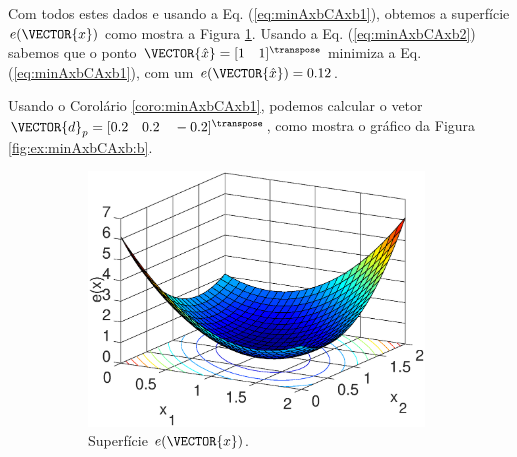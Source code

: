 \begin{SolutionT}
\label{ex:minAxbCAxb:sol1}
Com todos estes dados e usando a Eq. (\ref{eq:minAxbCAxb1}),
obtemos a superfície $e(\VECTOR{x})$ como mostra a Figura \ref{fig:ex:minAxbCAxb:a}.
Usando a Eq. (\ref{eq:minAxbCAxb2}) sabemos que o ponto $\VECTOR{\hat{x}}=[1\quad 1]^{\transpose}$
minimiza a Eq. (\ref{eq:minAxbCAxb1}), com um $e(\VECTOR{\hat{x}})=0.12$.

Usando o Corolário \ref{coro:minAxbCAxb1}, podemos calcular o vetor $\VECTOR{d}_p=[0.2 \quad 0.2 \quad -0.2]^{\transpose}$,
como mostra o gráfico da Figura \ref{fig:ex:minAxbCAxb:b}.

\begin{figure}[h!]
     \centering
     \begin{subfigure}[b]{0.66\textwidth}
         \centering
         \includegraphics[width=0.98\textwidth]{chapters/minimization-fx/mfiles/ax1/surfcex.eps}
         \caption{Superfície $e(\VECTOR{x})$. }
         \label{fig:ex:minAxbCAxb:a}
     \end{subfigure}
     \hfill
     \begin{subfigure}[b]{0.32\textwidth}
         \centering

\end{subfigure}
\end{figure}
\end{SolutionT}
